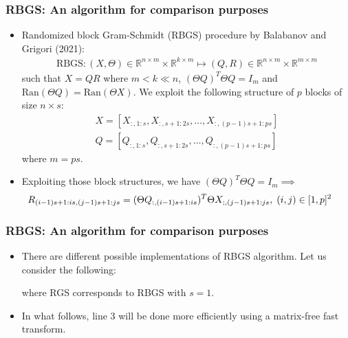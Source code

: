 \documentclass[t,usepdftitle=false]{beamer}
\begin{document}
\begin{frame}
	\frametitle{RBGS: An algorithm for comparison purposes}	
	\begin{itemize}
		\item Randomized block Gram-Schmidt (RBGS) procedure by Balabanov and Grigori (2021):
		\begin{align*}
		\mathrm{RBGS}:(X,\Theta)\in\mathbb{R}^{n\times m}\times\mathbb{R}^{k\times m}
		\mapsto
		(Q,R)\in\mathbb{R}^{n\times m}\times\mathbb{R}^{m\times m}
		\end{align*}
	    such that $X=QR$ where $m<k\ll n$, $(\Theta Q)^T\Theta Q=I_m$ and $\mathrm{Ran}(\Theta Q)=\mathrm{Ran}(\Theta X)$. We exploit the following structure of $p$  blocks of size $n\times s$:
		\begin{align*}
			X=[X_{:,1:s},X_{:,s+1:2s},\dots,X_{:,(p-1)s+1:ps}]\\
			Q=[Q_{:,1:s},Q_{:,s+1:2s},\dots,Q_{:,(p-1)s+1:ps}]
		\end{align*}
	    where $m=ps$.
		\item Exploiting those block structures, we have $(\Theta Q)^T\Theta Q=I_m\implies$
		\begin{align*}
			\hspace{-.5cm}
			R_{(i-1)s+1:is,(j-1)s+1:js}=(\Theta Q_{:,(i-1)s+1:is})^T\Theta X_{;,(j-1)s+1:js},
			\;(i,j)\in[1,p]^2
		\end{align*}
	\end{itemize}  
\end{frame}   

\begin{frame}
	\frametitle{RBGS: An algorithm for comparison purposes}	
	\begin{itemize}
		\item There are different possible implementations of RBGS algorithm.
		Let us consider the following:
	\setcounter{algorithm}{0}
	\begin{algorithm}[H]
		\small
		\caption{\small$\mathrm{RBGS}:(X,\Theta)\mapsto$($Q$, $R$)}
		\begin{algorithmic}[1]
			\ENDFOR
		\end{algorithmic}
	\end{algorithm}
	where RGS corresponds to RBGS with $s=1$.\emph{}
		\item In what follows, line 3 will be done more efficiently using a matrix-free fast transform.
	\end{itemize}  
\end{frame}   
\end{document}
